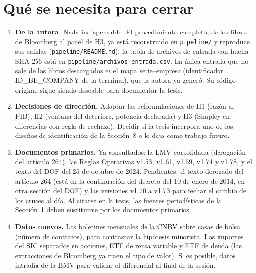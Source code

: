 \documentclass[11pt,letterpaper]{article}
\theoremstyle{definition}
\theoremstyle{plain}
\begin{document}
\section{Qué se necesita para cerrar}
\begin{enumerate}
\item \textbf{De la autora.} Nada indispensable. El procedimiento completo, de los libros de Bloomberg al panel de H3, ya está reconstruido en \texttt{pipeline/} y reproduce sus salidas (\texttt{pipeline/README.md}); la tabla de archivos de entrada con huella SHA-256 está en \texttt{pipeline/archivos\_entrada.csv}. La única entrada que no sale de los libros descargados es el mapa serie--empresa (identificador ID\_BB\_COMPANY de la terminal), que la autora ya generó. Su código original sigue siendo deseable para documentar la tesis.
\item \textbf{Decisiones de dirección.} Adoptar las reformulaciones de H1 (razón al PIB), H2 (ventana del deterioro, potencia declarada) y H3 (Shapley en diferencias con regla de rechazo). Decidir si la tesis incorpora uno de los diseños de identificación de la Sección~8 o lo deja como trabajo futuro.
\item \textbf{Documentos primarios.} Ya consultados: la LMV consolidada (derogación del artículo 264), las Reglas Operativas v1.53, v1.61, v1.69, v1.74 y v1.78, y el texto del DOF del 25 de octubre de 2024. Pendientes: el texto derogado del artículo 264 (está en la continuación del decreto del 10 de enero de 2014, en otra sección del DOF) y las versiones v1.70 a v1.73 para fechar el cambio de los cruces al día. Al citarse en la tesis, las fuentes periodísticas de la Sección~1 deben sustituirse por los documentos primarios.
\item \textbf{Datos nuevos.} Los boletines mensuales de la CNBV sobre casas de bolsa (número de contratos), para contrastar la hipótesis minorista. Los importes del SIC separados en acciones, ETF de renta variable y ETF de deuda (las extracciones de Bloomberg ya traen el tipo de valor). Si es posible, datos intradía de la BMV para validar el diferencial al final de la sesión.
\end{enumerate}

\end{document}
